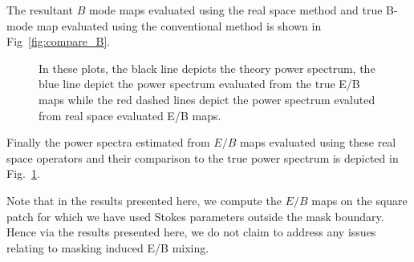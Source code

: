 \documentclass[12pt]{article}
\begin{document}
The resultant $B$ mode maps evaluated using the real space method and true B-mode map evaluated using the conventional method is shown in Fig~\ref{fig:compare_B}. 
%
\begin{figure}[!h]
\centering
{}
\caption{In these plots, the black line depicts the theory power spectrum, the blue line depict the power spectrum evaluated from the true E/B maps while the red dashed lines depict the power spectrum evaluted from real space evaluated E/B maps.}
\label{fig:compare_spectra}
\end{figure}
%
Finally the power spectra estimated from $E/B$ maps evaluated using these real space operators and their comparison to the true power spectrum is depicted in Fig.~\ref{fig:compare_spectra}. 

Note that in the results presented here, we compute the $E/B$ maps on the square patch for which we have used Stokes parameters outside the mask boundary. Hence via the results presented here, we do not claim to address any issues relating to masking induced E/B mixing.
\end{document}
